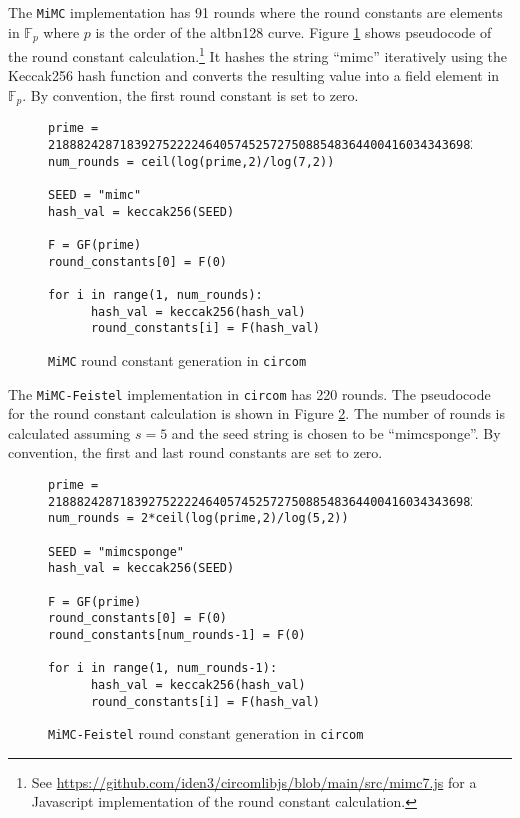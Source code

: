 \documentclass[10pt]{article}
\begin{document}
The \texttt{MiMC} implementation has 91 rounds where the round constants are elements in $\mathbb{F}_p$ where $p$ is the order of the alt\textunderscore bn128 curve. Figure \ref{fig:MiMCconstantscircom} shows pseudocode of the round constant calculation.\footnote{See \url{https://github.com/iden3/circomlibjs/blob/main/src/mimc7.js} for a Javascript implementation of the round constant calculation.} It hashes the string ``mimc'' iteratively using the Keccak256 hash function and converts the resulting value into a field element in $\mathbb{F}_p$. By convention, the first round constant is set to zero.
\begin{figure}[t]
\begin{verbatim}
prime = 21888242871839275222246405745257275088548364400416034343698204186575808495617
num_rounds = ceil(log(prime,2)/log(7,2))

SEED = "mimc"
hash_val = keccak256(SEED)

F = GF(prime)
round_constants[0] = F(0)

for i in range(1, num_rounds):
      hash_val = keccak256(hash_val)
      round_constants[i] = F(hash_val)
\end{verbatim}
\caption{\texttt{MiMC} round constant generation in \texttt{circom}}%
\label{fig:MiMCconstantscircom}
\end{figure}

The \texttt{MiMC-Feistel} implementation in \texttt{circom} has 220 rounds. The pseudocode for the round constant calculation is shown in Figure \ref{fig:MiMCFeistelconstantscircom}. The number of rounds is calculated assuming $s=5$ and the seed string is chosen to be ``mimcsponge''. By convention, the first and last round constants are set to zero.

\begin{figure}[t]
\begin{verbatim}
prime = 21888242871839275222246405745257275088548364400416034343698204186575808495617
num_rounds = 2*ceil(log(prime,2)/log(5,2))

SEED = "mimcsponge"
hash_val = keccak256(SEED)

F = GF(prime)
round_constants[0] = F(0)
round_constants[num_rounds-1] = F(0)

for i in range(1, num_rounds-1):
      hash_val = keccak256(hash_val)
      round_constants[i] = F(hash_val)
\end{verbatim}
\caption{\texttt{MiMC-Feistel} round constant generation in \texttt{circom}}%
\label{fig:MiMCFeistelconstantscircom}
\end{figure}
\end{document}
